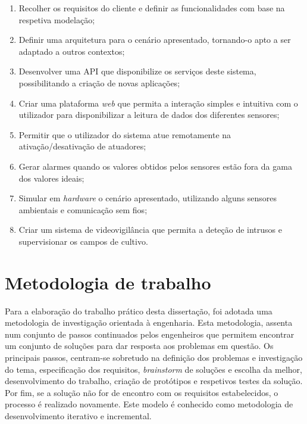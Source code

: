 \begin{enumerate}

	\item Recolher os requisitos do cliente e definir as funcionalidades com base na respetiva modelação; 
	
	\item Definir uma arquitetura para o cenário apresentado, tornando-o apto a ser adaptado a outros contextos; 
	
	\item Desenvolver uma \ac{API} que disponibilize os serviços deste sistema, possibilitando a criação de novas aplicações;   
	
	\item Criar uma plataforma \textit{web} que permita a  interação simples e intuitiva com o utilizador para disponibilizar a leitura de dados dos diferentes sensores; 
	
	\item Permitir que o utilizador do sistema atue remotamente na ativação/desativação de atuadores; 
	
	
	\item Gerar alarmes quando os valores obtidos pelos sensores estão fora da gama dos valores ideais; 
	
	\item Simular em \textit{hardware} o cenário apresentado, utilizando alguns sensores ambientais e comunicação sem fios; 
	
	\item Criar um sistema de videovigilância que permita a deteção de intrusos e supervisionar os campos de cultivo. 

\end{enumerate}


\section{Metodologia de trabalho}
\label{method}


Para a elaboração do trabalho prático desta dissertação, foi adotada uma metodologia de investigação orientada à engenharia\cite{desingprocess}. Esta metodologia, assenta num conjunto de passos continuados pelos engenheiros que permitem encontrar um conjunto de soluções para dar resposta aos problemas em questão. Os principais passos, centram-se sobretudo na definição dos problemas e investigação do tema, especificação dos requisitos, \textit{brainstorm} de soluções e escolha da melhor, desenvolvimento do trabalho, criação de protótipos e respetivos testes da solução. Por fim, se a solução não for de encontro com os requisitos estabelecidos, o processo é realizado novamente\cite{desingprocess}. Este modelo é conhecido como metodologia de desenvolvimento iterativo e incremental. 



